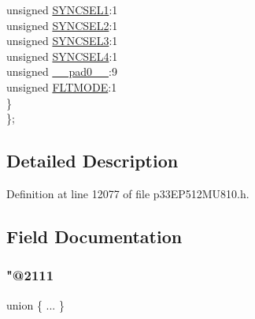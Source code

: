 \begin{DoxyCompactItemize}
\begin{tabbing}
\>\>unsigned \hyperlink{structtag_o_c14_c_o_n2_b_i_t_s_a50e73f95ab1c258ddc64f69c0991deaf}{SYNCSEL1}:1\\
\>\>unsigned \hyperlink{structtag_o_c14_c_o_n2_b_i_t_s_a304907a5d2c4cbf1114a54642a85951e}{SYNCSEL2}:1\\
\>\>unsigned \hyperlink{structtag_o_c14_c_o_n2_b_i_t_s_a6bbd1bd2ead6c9fa713969c6eb0f0c75}{SYNCSEL3}:1\\
\>\>unsigned \hyperlink{structtag_o_c14_c_o_n2_b_i_t_s_a0cd5bbe196c7974953909d27a6307bb7}{SYNCSEL4}:1\\
\>\>unsigned \hyperlink{structtag_o_c14_c_o_n2_b_i_t_s_adf71f3d8410c1f1dbbc96680a92c49af}{\_\_pad0\_\_}:9\\
\>\>unsigned \hyperlink{structtag_o_c14_c_o_n2_b_i_t_s_ad53c2a5303780172219bfd5e0100c782}{FLTMODE}:1\\
\>\} \\
\}; \\

\end{tabbing}\end{DoxyCompactItemize}


\subsection{Detailed Description}


Definition at line 12077 of file p33\+E\+P512\+M\+U810.\+h.



\subsection{Field Documentation}
\mbox{\label{structtag_o_c14_c_o_n2_b_i_t_s_a04f917e08cd0697ce1e270c83c9b7fc0}} 
\subsubsection{\texorpdfstring{"@2111}{@2111}}
{\footnotesize\ttfamily union \{ ... \} }

\mbox{\label{structtag_o_c14_c_o_n2_b_i_t_s_adf71f3d8410c1f1dbbc96680a92c49af}} 
